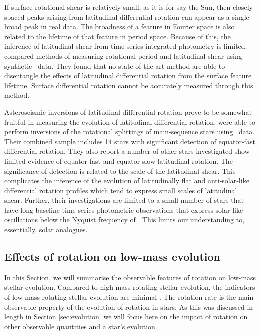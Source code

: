 If surface rotational shear is relatively small, as it is for say the Sun, then closely spaced peaks arising from latitudinal differential rotation can appear as a single broad peak in real data.
The broadness of a feature in Fourier space is also related to the lifetime of that feature in period space.
Because of this, the inference of latitudinal shear from time series integrated photometry is limited.
\citet{aigrain_hare_2015} compared methods of measuring rotational period and latitudinal shear using synthetic \kepler\ data.
They found that no state-of-the-art method \citep[e.g., those adopted by ][]{reinhold_rotation_2013, mcquillan_rotation_2014, garcia_rotation_2014} are able to disentangle the effects of latitudinal differential rotation from the surface feature lifetime.
Surface differential rotation cannot be accurately measured through this method.

Asteroseismic inversions of latitudinal differential rotation prove to be somewhat fruitful in measuring the evolution of latitudinal differential rotation.
\citet{benomar_asteroseismic_2018, bazot_latitudinal_2019, hall_weakened_2021} were able to perform inversions of the rotational splittings of main-sequence stars using \kepler\ data.
Their combined sample includes 14 stars with significant detection of equator-fast differential rotation.
They also report a number of other stars investigated show limited evidence of equator-fast and equator-slow latitudinal rotation.
The significance of detection is related to the scale of the latitudinal shear.
This complicates the inference of the evolution of latitudinally flat and anti-solar-like differential rotation profiles which tend to express small scales of latitudinal shear.
Further, their investigations are limited to a small number of stars that have long-baseline time-series photometric observations that express solar-like oscillations below the Nyquist frequency of \kepler{}.
This limits our understanding to, essentially, solar analogues.


\subsection{Effects of rotation on low-mass evolution}
\label{sec:effects}

In this Section, we will summarise the observable features of rotation on low-mass stellar evolution.
Compared to high-mass rotating stellar evolution, the indicators of low-mass rotating stellar evolution are minimal \citep[see, e.g.,][]{heger_presupernova_2000, maeder_evolution_2000}.
The rotation rate is the main observable property of the evolution of rotation in stars.
As this was discussed in length in Section \ref{sec:evolution} we will focus here on the impact of rotation on other observable quantities and a star's evolution.


